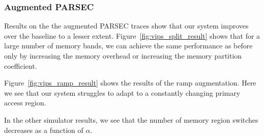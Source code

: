 
\subsubsection{Augmented PARSEC}

Results on the the augmented PARSEC traces show that our system improves over the baseline to a lesser extent.
%
%
Figure~\ref{fig:vips_split_result} shows that for a large number of memory bands, we can achieve the same performance as before only by increasing the memory overhead or increasing the memory partition coefficient.

Figure~\ref{fig:vips_ramp_result} shows the results of the ramp augmentation. Here we see that our system struggles to adapt to a constantly changing primary access region. 


In the other simulator results, we see that the number of memory region switches decreases as a function of $\alpha$. 


